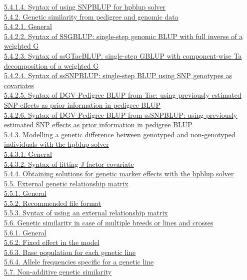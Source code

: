 \hyperref[Gene34]{5.4.1.4. Syntax of using SNPBLUP for hpblup solver}\\
\hyperref[Gene35]{5.4.2. Genetic similarity from pedigree and genomic
data}\\
\hyperref[Gene36]{5.4.2.1. General}\\
\hyperref[Gene37]{5.4.2.2. Syntax of SSGBLUP: single-step genomic BLUP
with full inverse of a weighted G}\\
\hyperref[Gene46]{5.4.2.3. Syntax of ssGTacBLUP: single-step GBLUP with
component-wise Ta decomposition of a weighted G}\\
\hyperref[Gene47]{5.4.2.4. Syntax of ssSNPBLUP: single-step BLUP using
SNP genotypes as covariates}\\
\hyperref[Gene48]{5.4.2.5. Syntax of DGV-Pedigree BLUP from Tac: using
previously estimated SNP effects as prior information in pedigree
BLUP}\\
\hyperref[Gene49]{5.4.2.6. Syntax of DGV-Pedigree BLUP from ssSNPBLUP:
using previously estimated SNP effects as prior information in pedigree
BLUP}\\
\hyperref[Gene50]{5.4.3. Modelling a genetic difference between
genotyped and non-genotyped individuals with the hpblup solver}\\
\hyperref[Gene51]{5.4.3.1. General}\\
\hyperref[Gene52]{5.4.3.2. Syntax of fitting J factor covariate}\\
\hyperref[Gene53]{5.4.4. Obtaining solutions for genetic marker effects
with the hpblup solver}\\
\hyperref[Gene54]{5.5. External genetic relationship matrix}\\
\hyperref[Gene55]{5.5.1. General}\\
\hyperref[Gene56]{5.5.2. Recommended file format}\\
\hyperref[Gene57]{5.5.3. Syntax of using an external relationship
matrix}\\
\hyperref[Gene58]{5.6. Genetic similarity in case of multiple breeds or
lines and crosses}\\
\hyperref[Gene59]{5.6.1. General}\\
\hyperref[Gene60]{5.6.2. Fixed effect in the model}\\
\hyperref[Gene61]{5.6.3. Base population for each genetic line}\\
\hyperref[Gene62]{5.6.4. Allele frequencies specific for a genetic
line}\\
\hyperref[Gene63]{5.7. Non-additive genetic similarity}\\
